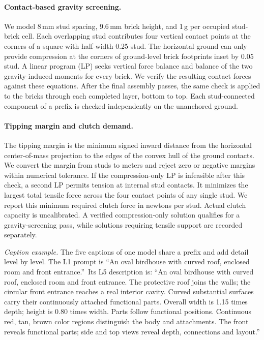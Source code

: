 \documentclass[letterpaper]{article} %
\begin{document}
\paragraph{Contact-based gravity screening.}
We model 8\,mm stud spacing, 9.6\,mm brick height, and 1\,g per occupied stud-brick cell. Each overlapping stud contributes four vertical contact points at the corners of a square with half-width 0.25 stud. The horizontal ground can only provide compression at the corners of ground-level brick footprints inset by 0.05 stud. A linear program (LP) seeks vertical force balance and balance of the two gravity-induced moments for every brick. We verify the resulting contact forces against these equations. After the final assembly passes, the same check is applied to the bricks through each completed layer, bottom to top. Each stud-connected component of a prefix is checked independently on the unanchored ground.

\paragraph{Tipping margin and clutch demand.}
The tipping margin is the minimum signed inward distance from the horizontal center-of-mass projection to the edges of the convex hull of the ground contacts. We convert the margin from studs to meters and reject zero or negative margins within numerical tolerance. If the compression-only LP is infeasible after this check, a second LP permits tension at internal stud contacts. It minimizes the largest total tensile force across the four contact points of any single stud. We report this minimum required clutch force in newtons per stud. Actual clutch capacity is uncalibrated. A verified compression-only solution qualifies for a gravity-screening pass, while solutions requiring tensile support are recorded separately.

\emph{Caption example.} The five captions of one model share a prefix and add detail level by level. The L1 prompt is \textquotedblleft An oval birdhouse with curved roof, enclosed room and front entrance.\textquotedblright\ Its L5 description is: ``An oval birdhouse with curved roof, enclosed room and front entrance. The protective roof joins the walls; the circular front entrance reaches a real interior cavity. Curved substantial surfaces carry their continuously attached functional parts. Overall width is 1.15 times depth; height is 0.80 times width. Parts follow functional positions. Continuous red, tan, brown color regions distinguish the body and attachments. The front reveals functional parts; side and top views reveal depth, connections and layout.''
\end{document}
